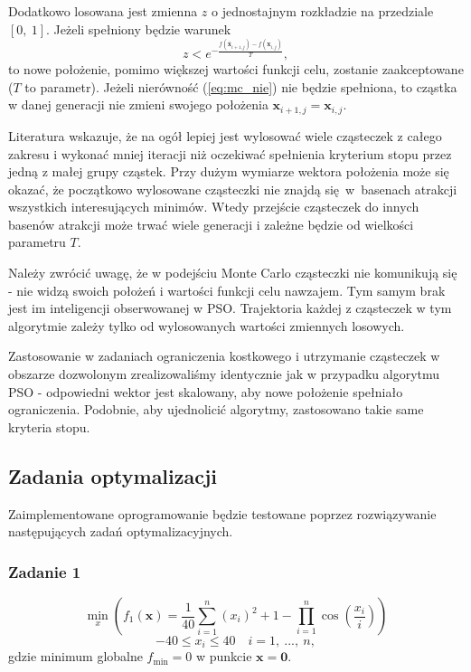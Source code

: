 \documentclass[11pt, a4paper, oneside]{article}
\newcommand{\vect}[1]{\bm{\mathbf{#1}}}
\begin{document}
Dodatkowo losowana jest zmienna $z$ o jednostajnym rozkładzie na przedziale $\left[0, \ 1 \right]$. Jeżeli spełniony będzie warunek
\begin{equation} \label{eq:mc_nie}
z < e^{-\frac{f\left(\vect{\overline{x}}_{i + 1, j}\right) - f\left(\vect{x}_{i, j}\right)}{T}},
\end{equation}
to nowe położenie, pomimo większej wartości funkcji celu, zostanie zaakceptowane ($T$ to parametr). Jeżeli nierówność (\ref{eq:mc_nie}) nie będzie spełniona, to cząstka w danej generacji nie zmieni swojego położenia $\vect{x}_{i + 1, j} = \vect{x}_{i, j}$. 

Literatura wskazuje, że na ogół lepiej jest wylosować wiele cząsteczek z całego zakresu i wykonać mniej iteracji niż oczekiwać spełnienia kryterium stopu przez jedną z małej grupy cząstek. Przy dużym wymiarze wektora położenia może się okazać, że początkowo wylosowane cząsteczki nie znajdą się~w~basenach atrakcji wszystkich interesujących minimów. Wtedy przejście cząsteczek do innych basenów atrakcji może trwać wiele generacji i zależne będzie od wielkości parametru $T$.

Należy zwrócić uwagę, że w podejściu Monte Carlo cząsteczki nie komunikują się - nie widzą swoich położeń i wartości funkcji celu nawzajem. Tym samym brak jest im inteligencji obserwowanej w PSO. Trajektoria każdej z cząsteczek w tym algorytmie zależy tylko od wylosowanych wartości zmiennych losowych.

Zastosowanie w zadaniach ograniczenia kostkowego i utrzymanie cząsteczek w obszarze dozwolonym zrealizowaliśmy identycznie jak w przypadku algorytmu PSO - odpowiedni wektor jest skalowany, aby nowe położenie spełniało ograniczenia. Podobnie, aby ujednolicić algorytmy, zastosowano takie same kryteria stopu.

\subsection{Zadania optymalizacji}
Zaimplementowane oprogramowanie będzie testowane poprzez rozwiązywanie następujących zadań optymalizacyjnych.
\subsubsection{Zadanie 1}
\begin{equation}
\min_{x} \left(f_{1}\left(\vect{x}\right) = \frac{1}{40} \sum_{i=1}^{n}\left(x_{i}\right)^{2} + 1 - \prod_{i =1}^{n} \cos\left(\frac{x_{i}}{i}\right)\right)
\end{equation}
\begin{equation}
-40 \leq x_{i} \leq 40 \quad i = 1, \ ..., \ n,
\end{equation}
gdzie minimum globalne $f_{\mathrm{min}} = 0$ w punkcie $\vect{x} = \vect{0}$.
\end{document}
